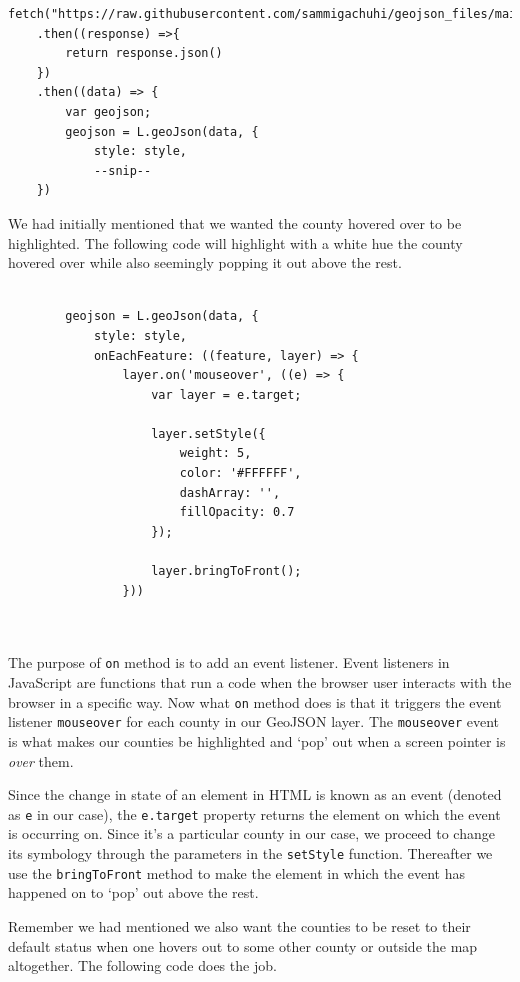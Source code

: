 \documentclass[
]{book}
\begin{document}
\begin{verbatim}
fetch("https://raw.githubusercontent.com/sammigachuhi/geojson_files/main/counties_json.json")
    .then((response) =>{
        return response.json()
    })
    .then((data) => {
        var geojson;
        geojson = L.geoJson(data, {
            style: style,
            --snip--
    })
\end{verbatim}

We had initially mentioned that we wanted the county hovered over to be highlighted. The following code will highlight with a white hue the county hovered over while also seemingly popping it out above the rest.

\begin{verbatim}

        geojson = L.geoJson(data, {
            style: style,
            onEachFeature: ((feature, layer) => {
                layer.on('mouseover', ((e) => {
                    var layer = e.target;
                
                    layer.setStyle({
                        weight: 5,
                        color: '#FFFFFF',
                        dashArray: '',
                        fillOpacity: 0.7
                    });
                
                    layer.bringToFront();
                }))
                
                
\end{verbatim}

The purpose of \texttt{on} method is to add an event listener. Event listeners in JavaScript are functions that run a code when the browser user interacts with the browser in a specific way. Now what \texttt{on} method does is that it triggers the event listener \texttt{mouseover} for each county in our GeoJSON layer. The \texttt{mouseover} event is what makes our counties be highlighted and `pop' out when a screen pointer is \emph{over} them.

Since the change in state of an element in HTML is known as an event (denoted as \texttt{e} in our case), the \texttt{e.target} property returns the element on which the event is occurring on. Since it's a particular county in our case, we proceed to change its symbology through the parameters in the \texttt{setStyle} function. Thereafter we use the \texttt{bringToFront} method to make the element in which the event has happened on to `pop' out above the rest.

Remember we had mentioned we also want the counties to be reset to their default status when one hovers out to some other county or outside the map altogether. The following code does the job.
\end{document}
